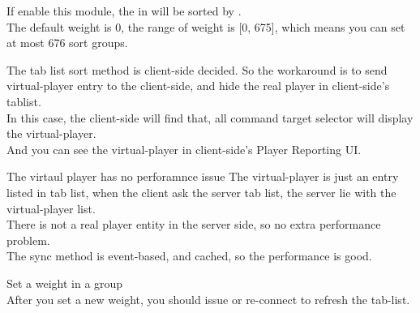 
If enable this module, the  in  will be sorted by .\\
The default weight is 0, the range of weight is [0, 675], which means you can set at most 676 sort groups.

The tab list sort method is client-side decided.
So the workaround is to send virtual-player entry to the client-side, and hide the real player in client-side's tablist.\\
In this case, the client-side will find that, all command target selector will display the virtual-player.\\
And you can see the virtual-player in client-side's Player Reporting UI\@.

\begin{note}{The virtaul player has no perforamnce issue}
    The virtual-player is just an entry listed in tab list, when the client ask the server tab list, the server lie with the virtual-player list.\\
    There is not a real player entity in the server side, so no extra performance problem.\\
    The sync method is event-based, and cached, so the performance is good.
\end{note}

\begin{example}{Set a weight in a group}
    \\
    After you set a new weight, you should issue  or re-connect to refresh the tab-list.
\end{example}




